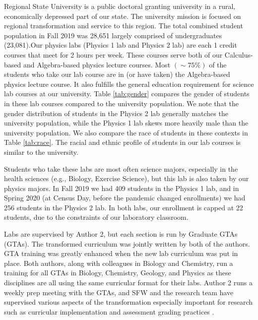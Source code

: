 \documentclass[aip, numerical, preprint]{revtex4-2}
\begin{document}
Regional State University is a public doctoral granting university in a rural, economically
depressed part of our state.  The university mission is focused on regional transformation and
service to this region.  The total combined student population in Fall 2019 was 28,651 largely
comprised of undergraduates (23,081).Our physics labs (Physics 1 lab and Physics 2 lab) are
each 1 credit courses that meet for 2 hours per week. These courses serve both of our
Calculus-based and Algebra-based physics lecture courses.  Most $(\sim 75\%)$ of the students
who take our lab course are in (or have taken) the Algebra-based physics lecture course. It
also fulfills the general education requirement for science lab courses at our university.
Table \ref{tab:gender} compares the gender of students in these lab courses compared to the
university population.  We note that the gender distribution of students in the Physics 2 lab
generally matches the university population, while the Physics 1 lab skews more heavily male
than the university population.  We also compare the race of students in these contexts in
Table \ref{tab:race}.  The racial and ethnic profile of students in our lab courses is similar
to the university.

Students who take these labs are most often science majors, especially in the health sciences
(e.g., Biology, Exercise Science), but this lab is also taken by our physics majors.  In Fall
2019 we had 409 students in the Physics 1 lab, and in Spring 2020 (at Census Day, before the
pandemic changed enrollments) we had 256 students in the Physics 2 lab.  In both labs, our
enrollment is capped at 22 students, due to the constraints of our laboratory classroom.

Labs are supervised by Author 2, but each section is run by Graduate GTAs (GTAs). The
transformed curriculum was jointly written by both of the authors.  GTA training was greatly
enhanced when the new lab curriculum was put in place.  Both authors, along with colleagues in
Biology and Chemistry, run a training for all GTAs in Biology, Chemistry, Geology, and Physics
as these disciplines are all using the same curricular format for their labs.  Author 2 runs a
weekly prep meeting with the GTAs, and SFW and the research team have supervised various
aspects of the transformation especially important for research such as curricular
implementation \citep{SmithJoyner2020} and assessment grading practices \citep{Wolf2019}.
\end{document}
